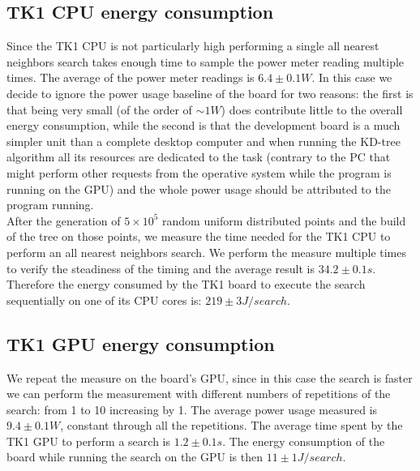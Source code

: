 \subsection{TK1 CPU energy consumption}
Since the TK1 CPU is not particularly high performing a single all nearest neighbors search takes enough time to sample the power meter reading multiple times. The average of the power meter readings is $6.4 \pm 0.1 \unit{W}$. In this case we decide to ignore the power usage baseline of the board for two reasons: the first is that being very small (of the order of $\sim 1 \unit{W}$) does contribute little to the overall energy consumption, while the second is that the development board is a much simpler unit than a complete desktop computer and when running the KD-tree algorithm all its resources are dedicated to the task (contrary to the PC that might perform other requests from the operative system while the program is running on the GPU) and the whole power usage should be attributed to the program running.\\
After the generation of $5 \times 10^5$ random uniform distributed points and the build of the tree on those points, we measure the time needed for the TK1 CPU to perform an all nearest neighbors search. We perform the measure multiple times to verify the steadiness of the timing and the average result is $34.2 \pm 0.1 \unit{s}$. Therefore the energy consumed by the TK1 board to execute the search sequentially on one of its CPU cores is: $219 \pm 3 \unit{J/search}$.

\subsection{TK1 GPU energy consumption}
We repeat the measure on the board's GPU, since in this case the search is faster we can perform the measurement with different numbers of repetitions of the search: from 1 to 10 increasing by 1. The average power usage measured is $9.4 \pm 0.1 \unit{W}$, constant through all the repetitions.
The average time spent by the TK1 GPU to perform a search is $1.2 \pm 0.1 \unit{s}$. The energy consumption of the board while running the search on the GPU is then $11 \pm 1 \unit{J/search}$.

